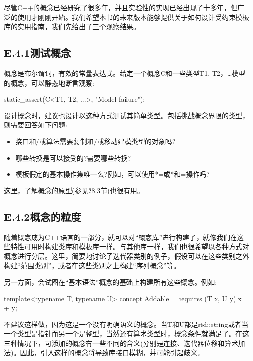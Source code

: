 
尽管C++的概念已经研究了很多年，并且实验性的实现已经出现了十多年，但广泛的使用才刚刚开始。我们希望本书的未来版本能够提供关于如何设计受约束模板库的实用指南，我们先给出了三个观察结果。

\subsection{E.4.1\hspace{0.2cm}测试概念}

概念是布尔谓词，有效的常量表达式。给定一个概念C和一些类型T1, T2，…模型的概念，可以静态地断言观察:

\begin{cpp}
static_assert(C<T1, T2, ...>, "Model failure");
\end{cpp}

设计概念时，建议也设计以这种方式测试其简单类型。包括挑战概念界限的类型，则需要回答如下问题:

\begin{itemize}
\item 
接口和/或算法需要复制和/或移动建模类型的对象吗?

\item 
哪些转换是可以接受的?需要哪些转换?

\item 
模板假定的基本操作集唯一么?例如，可以使用*=或*和=操作吗?
\end{itemize}

这里，了解概念的原型(参见28.3节)也很有用。

\subsection{E.4.2\hspace{0.2cm}概念的粒度}

随着概念成为C++语言的一部分，就可以对“概念库”进行构建了，就像我们在这些特性可用时构建类库和模板库一样。与其他库一样，我们也很希望以各种方式对概念进行分层。这里，简要地讨论了迭代器类别的例子，假设可以在这些类别之外构建“范围类别”，或者在这些类别之上构建“序列概念”等。

另一方面，会试图在“基本语法”概念的基础上构建所有这些概念。例如:

\begin{cpp}
template<typename T, typename U>
concept Addable =
requires (T x, U y) {
	x + y;
}
\end{cpp}

不建议这样做，因为这是一个没有明确语义的概念。当T和U都是std::string或者当一个类型是指针而另一个是整型，当然还有算术类型时，概念条件就满足了。在这三种情况下，可添加的概念有一些不同的含义(分别是连接、迭代器位移和算术加法)。因此，引入这样的概念将导致库接口模糊，并可能引起歧义。

